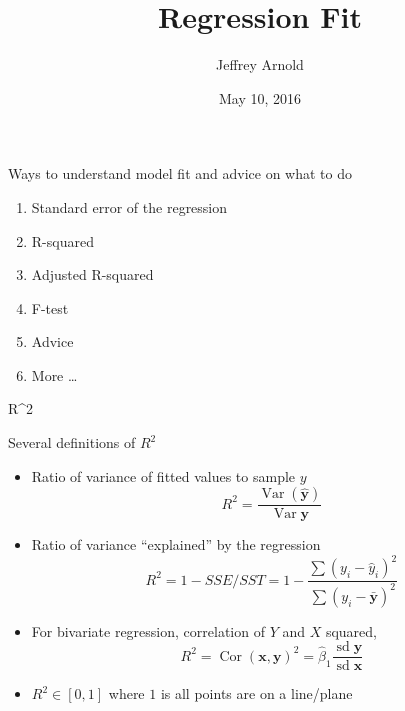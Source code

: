 \documentclass[ignorenonframetext,]{beamer}
\title{Regression Fit}
\author{Jeffrey Arnold}
\date{May 10, 2016}
\providecommand{\tightlist}{%
  \setlength{\itemsep}{0pt}\setlength{\parskip}{0pt}}
\DeclareMathOperator{\Var}{Var}
\DeclareMathOperator{\Cor}{Cor}
\DeclareMathOperator{\sd}{sd}
\renewcommand{\vec}[1]{\boldsymbol{#1}}
\begin{document}
\frame{\titlepage}

\begin{frame}{Ways to understand model fit and advice on what to do}

\begin{enumerate}[<+->]
\def\labelenumi{\arabic{enumi}.}
\tightlist
\item
  Standard error of the regression
\item
  R-squared
\item
  Adjusted R-squared
\item
  F-test
\item
  Advice
\item
  More \ldots{}
\end{enumerate}

\end{frame}

\begin{frame}{R\^{}2}

\end{frame}

\begin{frame}{Several definitions of \(R^2\)}

\begin{itemize}[<+->]
\item
  Ratio of variance of fitted values to sample \(y\) \[
  R^2 = \frac{\Var(\hat{\vec{y}})}{\Var{\vec{y}}}
  \]
\item
  Ratio of variance ``explained'' by the regression \[
  R^2 = 1 - SSE / SST = 1 - \frac{\sum (y_i - \hat{y}_i)^2}{\sum (y_i - \bar{\vec{y}})^2}
  \]
\item
  For bivariate regression, correlation of \(Y\) and \(X\) squared, \[
  R^2 = \Cor(\vec{x}, \vec{y})^2 = \hat{\beta}_1 \frac{\sd{\vec{y}}}{\sd{\vec{x}}}
  \]
\item
  \(R^2 \in [0, 1]\) where \(1\) is all points are on a line/plane
\end{itemize}

\end{frame}
\end{document}
